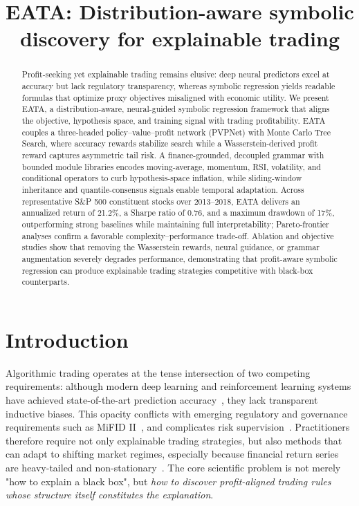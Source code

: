 \documentclass{elektr}
\title{
EATA: Distribution-aware symbolic discovery for explainable trading
}
\author[]{}%
\theoremstyle{corollary}
\theoremstyle{lemma}
\theoremstyle{proposition}
\theoremstyle{axiom}
\theoremstyle{conjecture}
\theoremstyle{example}
\theoremstyle{definition}
\theoremstyle{remark}
\begin{document}
\maketitle

\begin{abstract}
Profit-seeking yet explainable trading remains elusive: deep neural predictors excel at accuracy but lack regulatory transparency, whereas symbolic regression yields readable formulas that optimize proxy objectives misaligned with economic utility. We present EATA, a distribution-aware, neural-guided symbolic regression framework that aligns the objective, hypothesis space, and training signal with trading profitability. EATA couples a three-headed policy--value--profit network (PVPNet) with Monte Carlo Tree Search, where accuracy rewards stabilize search while a Wasserstein-derived profit reward captures asymmetric tail risk. A finance-grounded, decoupled grammar with bounded module libraries encodes moving-average, momentum, RSI, volatility, and conditional operators to curb hypothesis-space inflation, while sliding-window inheritance and quantile-consensus signals enable temporal adaptation. Across representative S\&P 500 constituent stocks over 2013--2018, EATA delivers an annualized return of 21.2\%, a Sharpe ratio of 0.76, and a maximum drawdown of 17\%, outperforming strong baselines while maintaining full interpretability; Pareto-frontier analyses confirm a favorable complexity--performance trade-off. Ablation and objective studies show that removing the Wasserstein rewards, neural guidance, or grammar augmentation severely degrades performance, demonstrating that profit-aware symbolic regression can produce explainable trading strategies competitive with black-box counterparts.

\end{abstract}

\section{Introduction}
\label{sec:intro}

Algorithmic trading operates at the tense intersection of two competing requirements: although modern deep learning and reinforcement learning systems have achieved state-of-the-art prediction accuracy~\cite{fischer2018deep}, they lack transparent inductive biases. This opacity conflicts with emerging regulatory and governance requirements such as MiFID II~\cite{eu2014mifid}, and complicates risk supervision~\cite{rudin2019stop}. Practitioners therefore require not only explainable trading strategies, but also methods that can adapt to shifting market regimes, especially because financial return series are heavy-tailed and non-stationary~\cite{cont2001empirical}. The core scientific problem is not merely "how to explain a black box", but \textit{how to discover profit-aligned trading rules whose structure itself constitutes the explanation}.
\end{document}
